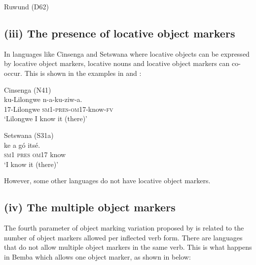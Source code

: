 \documentclass[output=paper]{langscibook}
\begin{document}
\ea\label{ex:ngunga:10}  Ruwund (D62)  \citep[241]{MartenKula2012}\\

\z
\z

 \subsection{(iii) The presence of locative object markers}

In languages like Cinsenga and Setswana where locative objects can be expressed by locative object markers, locative nouns and locative object markers can co-occur. This is shown in the examples in  and : 

\ea\label{ex:ngunga:11}  Cinsenga (N41)  \citep[243]{MartenKula2012}\\
\gll ku-Lilongwe  n-a-ku-ziw-a.\\
17-Lilongwe  {\textsc{sm}1}{}-{\textsc{pres}-\textsc{om}17}{}-know-{\textsc{fv}}\\
\glt ‘Lilongwe I know it (there)’
\z

\ea\label{ex:ngunga:12}  Setswana (S31a)\\
\gll ke  a  gó  itsé.\\
{\textsc{sm}1}  {\textsc{pres}}  {\textsc{om}17}  know\\
\glt ‘I know it (there)’
\z

However, some other languages do not have locative object markers.

\subsection{(iv) The multiple object markers}

The fourth parameter of object marking variation proposed by \citet{MartenKula2012} is related to the number of object markers allowed per inflected verb form. There are languages that do not allow multiple object markers in the same verb. This is what happens in Bemba which allows one object marker, as shown in  below:
\end{document}
